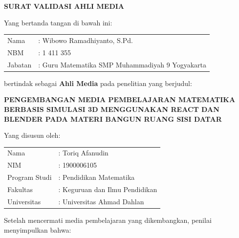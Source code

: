 \newpage
\pagestyle{empty}
\begin{center}
    {\large\bfseries SURAT VALIDASI AHLI MEDIA}
\end{center}

\vspace{0.3cm}

\noindent Yang bertanda tangan di bawah ini:

\vspace{0.2cm}

\noindent
\begin{tabular}{@{}ll@{}}
    Nama     & : Wibowo Ramadhiyanto, S.Pd. \\
    NBM     & : 1 411 355 \\
    Jabatan  & : Guru Matematika SMP Muhammadiyah 9 Yogyakarta \\
\end{tabular}

\vspace{0.2cm}

\noindent bertindak sebagai \textbf{Ahli Media} pada penelitian yang berjudul:

\vspace{0.2cm}

\begin{center}
    \textbf{PENGEMBANGAN MEDIA PEMBELAJARAN MATEMATIKA BERBASIS SIMULASI 3D MENGGUNAKAN REACT DAN BLENDER PADA MATERI BANGUN RUANG SISI DATAR}
\end{center}

\vspace{0.2cm}

\noindent Yang disusun oleh:

\vspace{0.2cm}

\noindent
\begin{tabular}{@{}ll@{}}
    Nama         & : Toriq Afanudin \\
    NIM          & : 1900006105 \\
    Program Studi & : Pendidikan Matematika \\
    Fakultas     & : Keguruan dan Ilmu Pendidikan \\
    Universitas  & : Universitas Ahmad Dahlan \\
\end{tabular}

\vspace{0.3cm}

\noindent Setelah mencermati media pembelajaran yang dikembangkan, penilai menyimpulkan bahwa:

